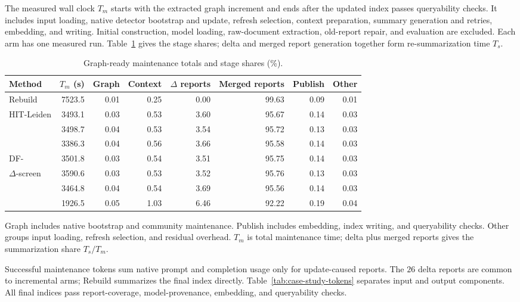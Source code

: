The measured wall clock $T_m$ starts with the extracted graph increment and
ends after the updated index passes queryability checks. It includes input
loading, native detector bootstrap and update, refresh selection, context
preparation, summary generation and retries, embedding, and writing.
Initial construction, model loading, raw-document extraction, old-report
repair, and evaluation are excluded. Each arm has one measured run.
Table~\ref{tab:maintenance-phases} gives the stage shares; delta and merged
report generation together form re-summarization time $T_s$.

\begin{table}[tb]\centering
\caption{Graph-ready maintenance totals and stage shares (\%).}
\label{tab:maintenance-phases}
\footnotesize
\setlength{\tabcolsep}{0.25em}
\begin{tabular*}{\linewidth}{@{\extracolsep{\fill}}lrrrrrrr@{}}
\toprule
Method & $T_m$ (s) & Graph & Context & $\Delta$ reports & Merged reports & Publish & Other \\
\midrule
Rebuild & 7523.5 & 0.01 & 0.25 & 0.00 & 99.63 & 0.09 & 0.01 \\
HIT-Leiden & 3493.1 & 0.03 & 0.53 & 3.60 & 95.67 & 0.14 & 0.03 \\
\DynaMo{} & 3498.7 & 0.04 & 0.53 & 3.54 & 95.72 & 0.13 & 0.03 \\
\QCA{} & 3386.3 & 0.04 & 0.56 & 3.66 & 95.58 & 0.14 & 0.03 \\
DF-\Louvain{} & 3501.8 & 0.03 & 0.54 & 3.51 & 95.75 & 0.14 & 0.03 \\
$\Delta$-screen & 3590.6 & 0.03 & 0.53 & 3.52 & 95.76 & 0.13 & 0.03 \\
\Batch{} & 3464.8 & 0.04 & 0.54 & 3.69 & 95.56 & 0.14 & 0.03 \\
\DyLo{} & 1926.5 & 0.05 & 1.03 & 6.46 & 92.22 & 0.19 & 0.04 \\
\bottomrule
\end{tabular*}
\par\smallskip\raggedright
Graph includes native bootstrap and community maintenance. Publish includes embedding, index writing, and queryability checks. Other groups input loading, refresh selection, and residual overhead. $T_m$ is total maintenance time; delta plus merged reports gives the summarization share $T_s/T_m$.
\end{table}

Successful maintenance tokens sum native prompt and completion usage only
for update-caused reports. The $26$ delta reports are common to incremental
arms; Rebuild summarizes the final index directly.
Table~\ref{tab:case-study-tokens} separates input and output components.
All final indices pass report-coverage, model-provenance, embedding, and
queryability checks.

